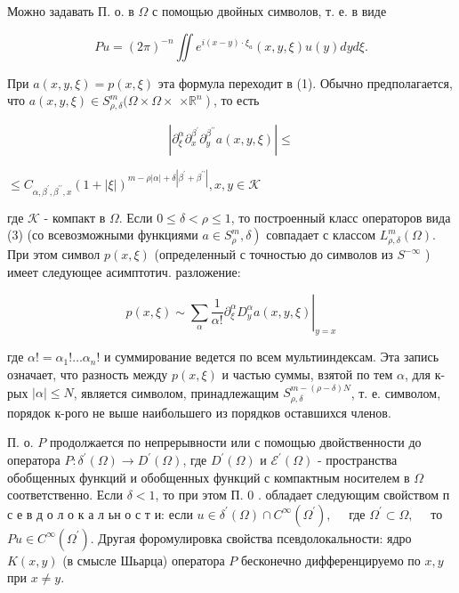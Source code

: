 \documentclass[10pt]{article}
\begin{document}
Можно задавать П. о. в $\Omega$ с помощью двойных символов, т. е. в виде



\[

P u=(2 \pi)^{-n} \iint e^{i(x-y) \cdot \xi_{a}}(x, y, \xi) u(y) d y d \xi .

\]



При $a(x, y, \xi)=p(x, \xi)$ эта формула переходит в (1). Обычно предполагается, что $a(x, y, \xi) \in S_{\rho, \delta}^{m}(\Omega \times \Omega \times$ $\left.\times \mathbb{R}^{n}\right)$, то есть



\[

\left|\partial_{\xi}^{\alpha} \partial_{x}^{\beta^{\prime}} \partial_{y}^{\beta^{\prime \prime}} a(x, y, \xi)\right| \leqslant

\]



$\leqslant C_{\alpha, \beta^{\prime}, \beta^{\prime \prime}, x}(1+|\xi|)^{m-\rho|\alpha|+\delta\left|\beta^{\prime}+\beta^{\prime \prime}\right|}, x, y \in \mathscr{K}$



где $\mathscr{K}$ - компакт в $\Omega$. Если $0 \leqslant \delta<\rho \leqslant 1$, то построенный класс операторов вида (3) (со всевозможными функциями $\left.a \in S_{\rho}^{m}, \delta\right)$ совпадает с классом $L_{\rho, \delta}^{m}(\Omega)$. При этом символ $p(x, \xi)$ (определенный с точностью до символов из $S^{-\infty}$ ) имеет следующее асимптотич. разложение:



\[

\left.p(x, \xi) \sim \sum_{\alpha} \frac{1}{\alpha !} \partial_{\xi}^{\alpha} D_{y}^{\alpha} a(x, y, \xi)\right|_{y=x}

\]



где $\alpha !=\alpha_{1} ! \ldots \alpha_{n} !$ и суммирование ведется по всем мультииндексам. Эта запись означает, что разность между $p(x, \xi)$ и частью суммы, взятой по тем $\alpha$, для к-рых $|\alpha| \leqslant N$, является символом, принадлежащим $S_{\rho, \delta}^{m-(\rho-\delta) N}$, т. е. символом, порядок к-рого не выше наибольшего из порядков оставшихся членов.



П. о. $P$ продолжается по непрерывности или с помощью двойственности до оператора $P: \delta^{\prime}(\Omega) \rightarrow D^{\prime}(\Omega)$, где $D^{\prime}(\Omega)$ и $\mathscr{E}^{\prime}(\Omega)$ - пространства обобщенных функций и обобщенных функций с компактным носителем в $\Omega$ соответственно. Если $\delta<1$, то при этом П. 0 . обладает следующим свойством п с е в д о л о к а л ьн о с т и: если $u \in \delta^{\prime}(\Omega) \cap C^{\infty}\left(\Omega^{\prime}\right), \quad$ где $\Omega^{\prime} \subset \Omega, \quad$ то $P u \in C^{\infty}\left(\Omega^{\prime}\right)$. Другая форомулировка свойства псевдолокальности: ядро $K(x, y)$ (в смысле Шьарца) оператора $P$ бесконечно дифференцируемо по $x, y$ при $x \neq y$.
\end{document}
